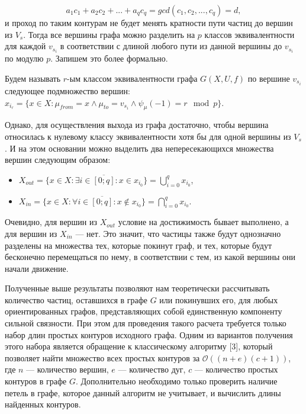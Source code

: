 \begin{equation*}
a_1c_1 + a_2c_2 + ... + a_qc_q = gcd(c_1, c_2, ... , c_q) = d,
\end{equation*}	и проход по таким контурам не будет менять кратности пути частиц до вершин из $V_s$. Тогда все вершины графа можно разделить на $p$ классов эквивалентности для каждой $v_{s_i}$ в соответствии с длиной любого пути из данной вершины до $v_{s_i}$ по модулю $p$.
Запишем это более формально.

\begin{definition}
	Будем называть $r$-ым классом эквивалентности графа $G(X, U, f)$ по вершине $v_{s_i}$ следующее подмножество вершин: $x_{i_r} = \{x \in X: \mu_{from} = x \wedge \mu_{to} = v_{s_i} \wedge \psi_\mu(-1) = r \mod p\}$.
\end{definition}

Однако, для осуществления выхода из графа достаточно, чтобы вершина относилась к нулевому классу эквивалентности хотя бы для одной вершины из $V_s$. И на этом основании можно выделить два непересекающихся множества вершин следующим образом:

\begin{itemize}
	\item $X_{out} = \{x \in X: \exists i \in \overline{ [0; q] } : x \in x_{i_0} \} = \bigcup_{i=0}^q x_{i_0}$, 
	\item $X_{in} = \{x \in X: \forall i \in \overline{ [0; q] } : x \notin x_{i_0} \} = \bigcap_{i=0}^q x_{i_0}$.
\end{itemize}

Очевидно, для вершин из $X_{out}$ условие на достижимость бывает выполнено, а для вершин из $X_{in}$ --- нет. Это значит, что частицы также будут однозначно разделены на множества тех, которые покинут граф, и тех, которые будут бесконечно перемещаться по нему, в соответствии с тем, из какой вершины они начали движение. 

Полученные выше результаты позволяют нам теоретически рассчитывать количество частиц, оставшихся в графе $G$ или покинувших его, для любых ориентированных графов, представляющих собой единственную компоненту сильной связности. При этом для проведения такого расчета требуется только набор длин простых контуров исходного графа. Одним из вариантов получения этого набора является обращение к классическому алгоритму [3], который позволяет найти множество всех простых контуров за $\mathcal{O}((n + e)(c + 1))$, где $n$ --- количество вершин, $e$ --- количество дуг, $c$ --- количество простых контуров в графе $G$. Дополнительно необходимо только проверить наличие петель в графе, которое данный алгоритм не учитывает, и вычислить длины найденных контуров. 

